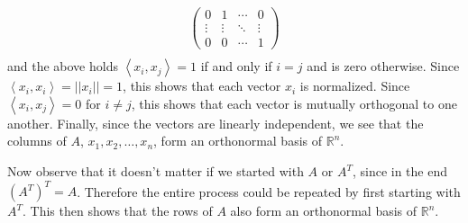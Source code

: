 \documentclass[12pt,letterpaper,boxed]{math_hw_pset}
\newcommand{\rr}{\mathbb{R}}
\newcommand{\<}{\left<}
\renewcommand{\>}{\right>}
\begin{document}
\begin{solution}
\begin{enumerate}
\begin{align*}
\begin{pmatrix}
                0 & 1 & \cdots & 0 \\
                \vdots & \vdots & \ddots & \vdots\\
                0 & 0 & \cdots & 1
            \end{pmatrix}\\
        \end{align*}
        and the above holds $\left<x_i, x_j\right> = 1$ 
        if and only if $i = j$ and is zero otherwise. Since 
        $\left<x_i, x_i\right> = ||x_i|| = 1$, this shows that each vector $x_i$
        is normalized. Since $\left<x_i, x_j\right> = 0$ for $i \ne j$, this shows that 
        each vector is mutually orthogonal to one another. Finally, since the 
        vectors are linearly independent, we see that the columns of $A$, 
        $x_1, x_2, \dots, x_n$, form an orthonormal basis of $\rr^n$. 

        Now observe that it doesn't matter if we started with $A$ or $A^T$, since in 
        the end $(A^T)^T = A$. Therefore the entire process could be repeated by first starting with 
        $A^T$. This then shows that the rows of $A$ also form an orthonormal basis of $\rr^n$. 


\end{enumerate}
\end{solution}
\end{document}
